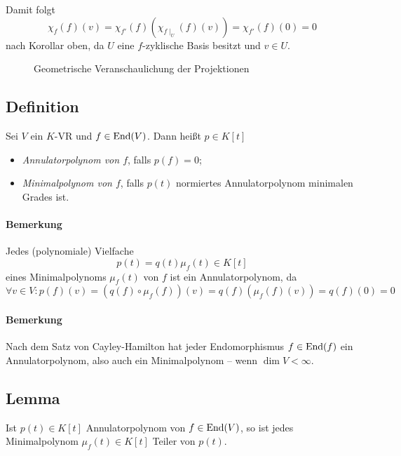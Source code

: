 	Damit folgt
		\[ \chi_f(f)(v) = \chi_{f'}(f) \left(\chi_{f\mid_U}(f)(v) \right) = \chi_{f'}(f)(0)=0 \]
	nach Korollar oben, da $ U $ eine $ f $-zyklische Basis besitzt und $ v\in U $.
	
	\begin{figure}[h]\centering
		
		\caption{Geometrische Veranschaulichung der Projektionen}
	\end{figure}\noindent
	
\subsection{Definition}
\begin{Definition}
	Sei $ V $ ein $ K $-VR und $ f\in\operatorname{End}(V) $. Dann heißt $ p\in K[t] $
		\begin{itemize}
			\item \emph{Annulatorpolynom von $ f $}, falls $ p(f)=0 $;
			\item \emph{Minimalpolynom von $ f $}, falls $ p(t) $ normiertes Annulatorpolynom minimalen Grades ist.
		\end{itemize}
\end{Definition}
\paragraph{Bemerkung}
	Jedes (polynomiale) Vielfache 
		\[ p(t) = q(t)\mu_f(t)\in K[t] \]
	eines Minimalpolynoms $ \mu_f(t) $ von $ f $ ist ein Annulatorpolynom, da
		\[ \forall v\in V: p(f)(v) = \left(q(f)\circ \mu_f(f)\right)(v) = q(f)\left(\mu_f(f)(v)\right) = q(f)(0) = 0 \]
\paragraph{Bemerkung}
	Nach dem Satz von Cayley-Hamilton hat jeder Endomorphismus $ f\in\operatorname{End}(f) $ ein Annulatorpolynom, also auch ein Minimalpolynom -- wenn $ \dim V < \infty $.
	
\subsection{Lemma}
\begin{Lemma}
	Ist $ p(t)\in K[t] $ Annulatorpolynom von $ f\in\operatorname{End}(V) $, so ist jedes Minimalpolynom $ \mu_f(t)\in K[t] $ Teiler von $ p(t) $. 
\end{Lemma}

